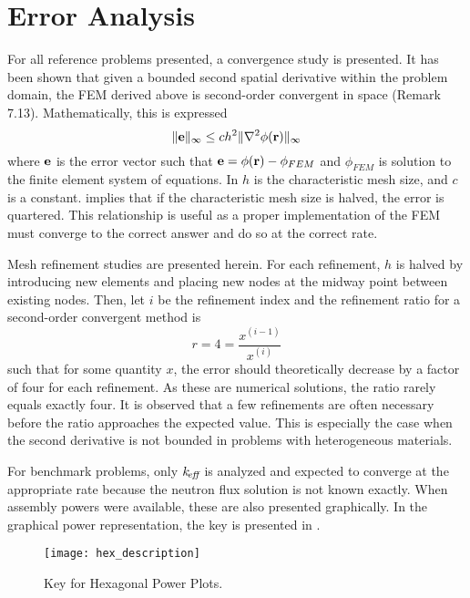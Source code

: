 \section{Error Analysis}
  For all reference problems presented, a convergence study is presented. It has 
  been shown that given a bounded second spatial derivative within the problem 
  domain, the FEM derived above is second-order convergent in space
  \cite{textbookli} (Remark 7.13). Mathematically, this is expressed
  \begin{equation} 
    \label{eq:error_bound}
    \|\mathbf{e}\|_{\infty} \le c h^2 \| \mathbf{\nabla}^2 \phi(\mathbf{r}) \|_{\infty}
  \end{equation}
  where $\mathbf{e}$ is the error vector such that $\mathbf{e} = \phi(\mathbf{r}) - \phi_{FEM}$ and
  $\phi_{FEM}$ is solution to the finite element system of equations. In
   $h$ is the characteristic mesh size, and $c$ is a 
  constant.   implies that if the characteristic mesh size
  is halved, the error is quartered. This relationship is useful as a proper 
  implementation of the FEM must converge to the correct answer and do so at the 
  correct rate.
  
  Mesh refinement studies are presented herein. For each refinement, $h$ is 
  halved by introducing new elements and placing new nodes at the midway point
  between existing nodes. Then, let $i$ be the refinement index and the
  refinement ratio for a second-order convergent method is 
  \begin{equation}
    r = 4 = \frac{x^{(i-1)}}{x^{(i)}}
  \end{equation}
  such that for some quantity $x$, the error should theoretically decrease by a
  factor of four for each refinement. As these are numerical solutions, the 
  ratio rarely equals exactly four. It is observed that a few refinements are 
  often necessary before the ratio approaches the expected value. This is 
  especially the case when the second derivative is not bounded in problems with 
  heterogeneous materials.
  
  For benchmark problems, only $k_{\!\mbox{\scriptsize \em eff}}$ is analyzed and expected to converge
  at the appropriate rate because the neutron flux solution is not known 
  exactly. When assembly powers were available, these are also
  presented graphically. In the graphical power representation, the key is 
  presented in .

  \begin{figure}
    \centering
    \texttt{[image: hex\_description]}
    \caption{Key for Hexagonal Power Plots.}
    \label{fig:hex_description}
  \end{figure}
  

